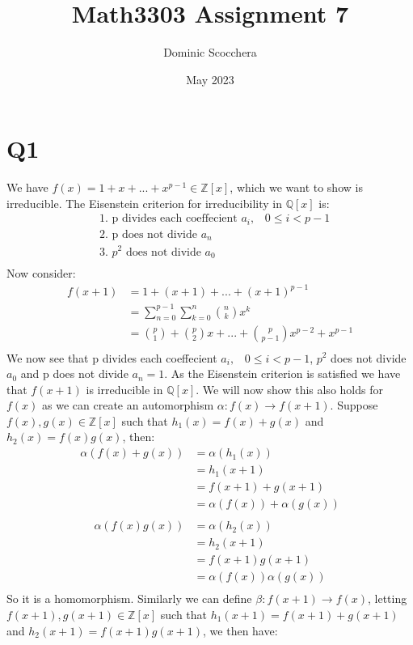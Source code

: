 \documentclass{article}
\title{Math3303 Assignment 7}
\author{Dominic Scocchera}
\date{May 2023}
\theoremstyle{definition}
\begin{document}
\maketitle
\section*{Q1}
We have $f(x)=1+x+...+x^{p-1}\in\mathbb{Z}[x]$, which we want to show is irreducible. The Eisenstein criterion for irreducibility in $\mathbb{Q}[x]$ is:
\begin{align*}
&\text{1. p divides each coeffecient }a_i,\;\;\;0\leq i<p-1\\
&\text{2. p does not divide }a_n\\
&\text{3. }p^2\text{ does not divide }a_0\\
\end{align*}
Now consider:
\begin{align*}
f(x+1)&=1+(x+1)+...+(x+1)^{p-1}\\
&=\sum_{n=0}^{p-1}\sum_{k=0}^{n}{n \choose k}x^k\\
&={p \choose 1}+{p \choose 2}x+...+{p \choose p-1}x^{p-2}+x^{p-1}\\
\end{align*}
We now see that p divides each coeffecient $a_i,\;\;\;0\leq i<p-1$, $p^2$ does not divide $a_0$ and p does not divide $a_n=1$. As the Eisenstein criterion is satisfied we have that $f(x+1)$ is irreducible in $\mathbb{Q}[x]$. We will now show this also holds for $f(x)$ as we can create an automorphism $\alpha:f(x)\rightarrow f(x+1)$. Suppose $f(x),g(x)\in\mathbb{Z}[x]$ such that $h_1(x)=f(x)+g(x)$ and $h_2(x)=f(x)g(x)$, then:
\begin{align*}
\alpha(f(x)+g(x))&=\alpha(h_1(x))\\
&=h_1(x+1)\\
&=f(x+1)+g(x+1)\\
&=\alpha(f(x))+\alpha(g(x))\\
\end{align*}
\begin{align*}
\alpha(f(x)g(x))&=\alpha(h_2(x))\\
&=h_2(x+1)\\
&=f(x+1)g(x+1)\\
&=\alpha(f(x))\alpha(g(x))\\
\end{align*}
So it is a homomorphism. Similarly we can define $\beta:f(x+1)\rightarrow f(x)$, letting $f(x+1),g(x+1)\in\mathbb{Z}[x]$ such that $h_1(x+1)=f(x+1)+g(x+1)$ and $h_2(x+1)=f(x+1)g(x+1)$, we then have:
\end{document}
